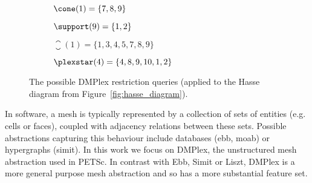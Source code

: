 \begin{figure}
  \centering
  \begin{subfigure}{0.45\textwidth}
    \centering
    \caption{$\cone(1) = \{7,8,9\}$}
  \end{subfigure}
  \begin{subfigure}{0.45\textwidth}
    \centering
    \caption{$\support(9) = \{1,2\}$}
  \end{subfigure}
  \begin{subfigure}{0.45\textwidth}
    \centering
    \caption{$\closure(1) = \{1,3,4,5,7,8,9\}$}
  \end{subfigure}
  \begin{subfigure}{0.45\textwidth}
    \centering
    \caption{$\plexstar(4) = \{4,8,9,10,1,2\}$}
  \end{subfigure}

  \caption{The possible DMPlex restriction queries (applied to the Hasse diagram from Figure~\ref{fig:hasse_diagram}).}
  \label{fig:plex_restrictions}
\end{figure}



In software, a mesh is typically represented by a collection of sets of entities (e.g. cells or faces), coupled with adjacency relations between these sets.
Possible abstractions capturing this behaviour include databases (ebb, moab) or hypergraphs (simit).
In this work we focus on DMPlex, the unstructured mesh abstraction used in PETSc.
In contrast with Ebb, Simit or Liszt, DMPlex is a more general purpose mesh abstraction and so has a more substantial feature set.

